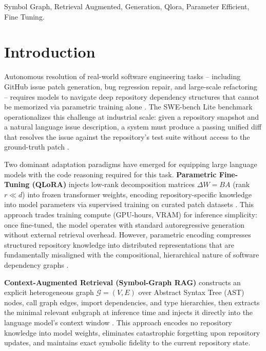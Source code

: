 \documentclass[10pt,journal,compsoc,twocolumn]{IEEEtran}
\begin{document}
\begin{IEEEkeywords}
Symbol Graph, Retrieval Augmented, Generation, Qlora, Parameter Efficient, Fine Tuning.
\end{IEEEkeywords}






\section{Introduction}


Autonomous resolution of real-world software engineering tasks -- including GitHub issue patch generation, bug regression repair, and large-scale refactoring -- requires models to navigate deep repository dependency structures that cannot be memorized via parametric training alone \cite{arxiv_2405_01543,arxiv_2501_02842}. The SWE-bench Lite benchmark operationalizes this challenge at industrial scale: given a repository snapshot and a natural language issue description, a system must produce a passing unified diff that resolves the issue against the repository's test suite without access to the ground-truth patch \cite{arxiv_2203_02155}.

Two dominant adaptation paradigms have emerged for equipping large language models with the code reasoning required for this task. \textbf{Parametric Fine-Tuning (QLoRA)} injects low-rank decomposition matrices $\Delta W = BA$ (rank $r \ll d$) into frozen transformer weights, encoding repository-specific knowledge into model parameters via supervised training on curated patch datasets \cite{arxiv_2305_18290,arxiv_2208_14227}. This approach trades training compute (GPU-hours, VRAM) for inference simplicity: once fine-tuned, the model operates with standard autoregressive generation without external retrieval overhead. However, parametric encoding compresses structured repository knowledge into distributed representations that are fundamentally misaligned with the compositional, hierarchical nature of software dependency graphs \cite{arxiv_2406_00584}.

\textbf{Context-Augmented Retrieval (Symbol-Graph RAG)} constructs an explicit heterogeneous graph $\mathcal{G} = (V, E)$ over Abstract Syntax Tree (AST) nodes, call graph edges, import dependencies, and type hierarchies, then extracts the minimal relevant subgraph at inference time and injects it directly into the language model's context window \cite{crossref_10_1145_3689096_3689462,crossref_10_18653_v1_2026_findings_acl_1933}. This approach encodes no repository knowledge into model weights, eliminates catastrophic forgetting upon repository updates, and maintains exact symbolic fidelity to the current repository state.
\end{document}
